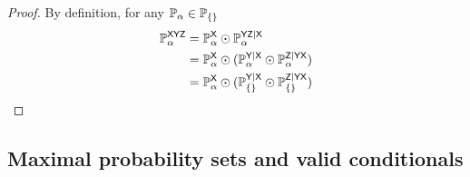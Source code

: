 \begin{proof}
By definition, for any $\mathbb{P}_\alpha\in \mathbb{P}_{\{\}}$
\begin{align}
	\mathbb{P}_\alpha^{\mathsf{XYZ}} &= \mathbb{P}_\alpha^{\mathsf{X}}\odot \mathbb{P}_\alpha^{\mathsf{YZ}|\mathsf{X}}\\
							   &= \mathbb{P}_\alpha^{\mathsf{X}}\odot(\mathbb{P}_\alpha^{\mathsf{Y}|\mathsf{X}}\odot \mathbb{P}_\alpha^{\mathsf{Z}|\mathsf{YX}})\\
							   &= \mathbb{P}_\alpha^{\mathsf{X}}\odot(\mathbb{P}_{\{\}}^{\mathsf{Y}|\mathsf{X}}\odot \mathbb{P}_{\{\}}^{\mathsf{Z}|\mathsf{YX}})
\end{align}
\end{proof}







\subsection{Maximal probability sets and valid conditionals}

